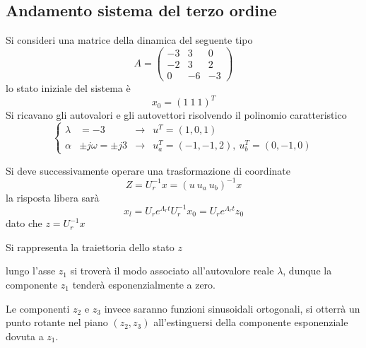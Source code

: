 
\subsection{Andamento sistema del terzo ordine}
Si consideri una matrice della dinamica del seguente tipo
$$
A = \begin{pmatrix}
-3 & 3 & 0\\
-2 & 3 & 2\\
0  & -6 & -3
\end{pmatrix}
$$
lo stato iniziale del sistema è
$$
x_0 = (1 \ 1\ 1)^T
$$
Si ricavano gli autovalori e gli autovettori risolvendo il polinomio
caratteristico
$$
\left\{\begin{aligned}
\lambda &= -3 &\rightarrow& u^T=(1, 0, 1)\\
\alpha &\pm j\omega = \pm j3 &\rightarrow& u_a^T=(-1, -1 , 2),\ u_b^T = (0, -1 ,
0)
\end{aligned}\right.
$$

Si deve successivamente operare una trasformazione di coordinate
$$
Z = U_r^{-1}x = (u\ u_a \ u_b)^{-1}x
$$
la risposta libera sarà
$$
x_l = U_re^{\Lambda_r t}U_r^{-1} x_0 = U_r e^{\Lambda_r t} z_0
$$
dato che $z = U_r^{-1} x$

Si rappresenta la traiettoria dello stato $z$

\begin{figure}[H]
 \centering
\end{figure}


lungo l'asse $z_1$ si troverà il modo associato all'autovalore reale $\lambda$,
dunque la componente $z_1$ tenderà esponenzialmente a zero.

Le componenti $z_2$ e $z_3$ invece saranno funzioni sinusoidali ortogonali, si
otterrà un punto rotante nel piano $(z_2,z_3)$ all'estinguersi della componente
esponenziale dovuta a $z_1$.

